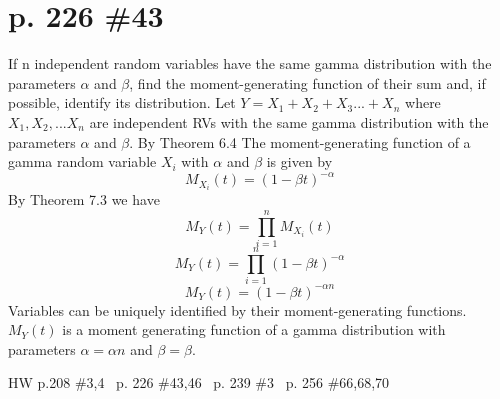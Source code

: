 \documentclass[12pt]{article}
\begin{document}
	\section[20pt]{p. 226 \#43}
	If n independent random variables have the same gamma distribution with the parameters \(\alpha\) and \(\beta\), find the moment-generating function of their sum and, if possible, identify its distribution.
	\newline
	\newline
	Let \(Y=X_1+X_2+X_3...+X_n\) where \(X_1, X_2,...X_n\) are independent RVs with the same gamma distribution with the parameters \(\alpha\) and \(\beta\). \newline
	By Theorem 6.4 The moment-generating function of a gamma random variable \(X_i\) with \(\alpha\) and \(\beta\) is given by
	\[M_{X_i}(t)=(1-\beta t)^{-\alpha}\]
	By Theorem 7.3 we have
	\[M_Y(t)=\prod_{i=1}^nM_{X_i}(t)\]
	\[M_Y(t)=\prod_{i=1}^n(1-\beta t)^{-\alpha}\]
	\[M_Y(t)=(1-\beta t)^{-\alpha n}\]
	Variables can be uniquely identified by their moment-generating functions. \newline \newline
	\(M_Y(t)\) is a moment generating function of a gamma distribution with parameters \(\alpha=\alpha n\) and \(\beta = \beta\). \newline \newline
	\newpage
	\maketitle HW p.208 \#3,4 \ p. 226 \#43,46 \ p. 239 \#3 \ p. 256 \#66,68,70
\end{document}
